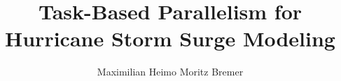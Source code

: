 \documentclass[12pt]{report}
\title{Task-Based Parallelism for Hurricane Storm Surge Modeling}
\author{Maximilian Heimo Moritz Bremer}
\begin{document}


%
%


\newpage

\begin{singlespacing}
\tableofcontents
\end{singlespacing}
\newpage
{} 







\singlespacing%

%
\end{document}
